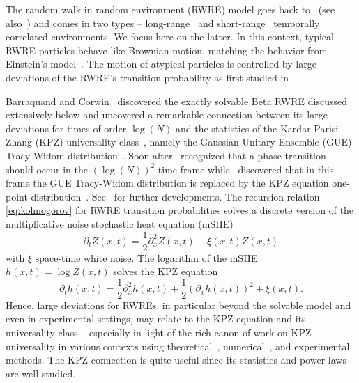 The random walk in random environment (RWRE) model goes back to~\cite{chernov_replication_1967, temkin_one-dimensional_1972} (see also~\cite{havlin_diffusion_2002, bolthausen_ten_2002,sznitman_topics_2004, ofer_random_2004, hughes_random_1995}) and comes in two types -- long-range~\cite{kesten_limit_1975,sinai_limiting_1983,bouchaud_classical_1990, bouchaud_anomalous_1990, burlatsky_transient_1998, le_doussal_random_1999} and short-range~\cite{richardson_atmospheric_1926, hentschel_relative_1984, bouchaud_diffusion_1990,  chertkov_anomalous_1996, bernard_anomalous_1996, jullien_richardson_1999, balkovsky_intermittent_2001} temporally correlated environments. We focus here on the latter. In this context, typical RWRE particles behave like Brownian motion, matching the behavior from Einstein's model~\cite{rassoul-agha_almost_2005, deuschel_quenched_2016}.
The motion of atypical particles is controlled by large deviations of the RWRE's transition probability as first studied in ~\cite{balazs_random_2006}.

Barraquand and Corwin~\cite{barraquand_random-walk_2017} discovered the exactly solvable Beta RWRE discussed extensively below and uncovered a remarkable connection between its large deviations for times of order $\log(N)$ and the statistics of the Kardar-Parisi-Zhang (KPZ) universality class~\cite{corwin_kardar_2012, quastel_one-dimensional_2015}, namely the Gaussian Unitary Ensemble (GUE) Tracy-Widom distribution~\cite{tracy_level-spacing_1993}. Soon after~\cite{le_doussal_diffusion_2017} recognized that a phase transition should occur in the $(\log(N))^2$ time frame while~\cite{barraquand_moderate_2020} discovered that in this frame the GUE Tracy-Widom distribution is replaced by the KPZ equation one-point distribution~\cite{kardar_dynamic_1986,sasamoto_one-dimensional_2010,calabrese_free-energy_2010,dotsenko_bethe_2010,amir_probability_2011}. See~\cite{sabot_random_2017,balazs_large_2019, barraquand_large_2020, brockington_bethe_2021, oviedo_second_2021,korotkikh_hidden_2022,krajenbrink_crossover_2022} for further developments. The recursion relation \eqref{eq:kolmogorov} for RWRE transition probabilities solves a discrete version of the multiplicative noise stochastic heat equation (mSHE)
\begin{equation}
\partial_t Z(x,t) = \frac{1}{2} \partial_x^2 Z(x,t) + \xi(x,t)Z(x,t)
\end{equation}
with $\xi$ space-time white noise. The logarithm of the mSHE $h(x,t)=\log Z(x,t)$ solves the KPZ equation
\begin{equation}\label{eq:KPZ}
\partial_t h(x,t) = \frac{1}{2} \partial_x^2 h(x,t) + \frac{1}{2}(\partial_x h(x,t))^2 + \xi(x,t).
\end{equation}
Hence, large deviations for RWREs, in particular beyond the solvable model and even in experimental settings, may relate to the KPZ equation and its universality class -- especially in light of the rich canon of work on KPZ universality in various contexts using theoretical~\cite{alberts_intermediate_2010, corwin_kardar_2012}, numerical~\cite{krug_amplitude_1992, prolhac_height_2011}, and experimental~\cite{halpin-healy_kpz_2015} methods. The KPZ connection is  quite useful since its statistics and power-laws are well studied.

